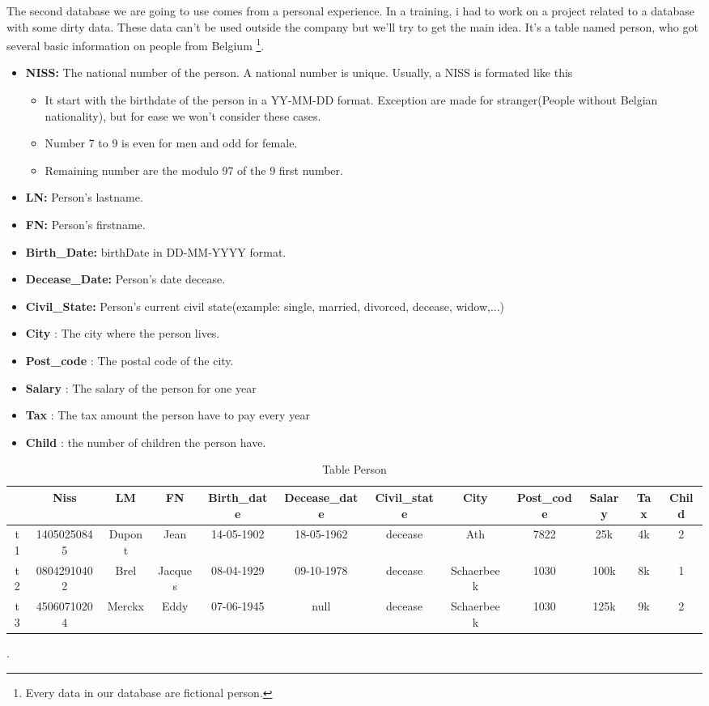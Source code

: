 \documentclass[letterpaper, 12pt]{report}
\begin{document}
The second database we are going to use comes from a personal experience. In a training, i had to work on a project related to a database with some dirty data. These data can't be used outside the company but we'll try to get the main idea. It's a table named person, who got several basic information on people from Belgium \footnote{Every data in our database are fictional person.}.
\begin{itemize}
\item \textbf{NISS:} The national number of the person. A national number is unique. Usually, a NISS is formated like this\cite{bcss}
	\begin{itemize}
	\item It start with the birthdate of the person in a YY-MM-DD format. Exception are made for stranger(People without Belgian nationality), but for ease we won't consider these cases.
	\item Number 7 to 9 is even for men and odd for female.
	\item Remaining number are the modulo 97 of the 9 first number. 
	\end{itemize}
\item \textbf{LN:} Person's lastname.
\item \textbf{FN:} Person's firstname.
\item \textbf{Birth\_Date:} birthDate in DD-MM-YYYY format.
\item \textbf{Decease\_Date:} Person's date decease.
\item \textbf{Civil\_State:} Person's current civil state(example: single, married, divorced, decease, widow,...)
\item \textbf{City} : The city where the person lives.
\item \textbf{Post\_code} : The postal code of the city.
\item \textbf{Salary} : The salary of the person for one year
\item \textbf{Tax} : The tax amount the person have to pay every year
\item \textbf{Child} : the number of children the person have.
\end{itemize}

\begin{table}[H]
 \tiny
	\centering
	\hspace*{-1.5cm}\begin{tabular}{|c|c c c c c c c c c c c|}
	\hline
	    & Niss & LM & FN & Birth\_date & Decease\_date & Civil\_state & City & Post\_code& Salary & Tax & Child\\
	\hline
	 t1 & 14050250845 & Dupont & Jean & 14-05-1902 & 18-05-1962 & decease & Ath & 7822 & 25k & 4k & 2\\
	 t2 & 08042910402 & Brel & Jacques & 08-04-1929 & 09-10-1978 & decease & Schaerbeek & 1030 & 100k & 8k & 1\\
	 t3 & 45060710204 & Merckx & Eddy & 07-06-1945 & null & decease & Schaerbeek & 1030 & 125k & 9k & 2\\
	\hline
	 
	 \hline
	\end{tabular}
	\caption{\label{tablePerson} Table Person}.
\end{table}
\end{document}
